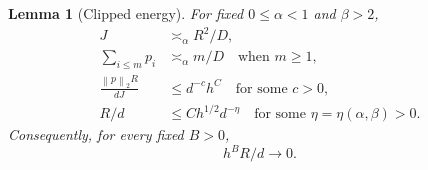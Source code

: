 \documentclass[11pt]{article}
\newtheorem{lemma}[theorem]{Lemma}
\theoremstyle{remark}
\newcommand{\norm}[1]{\left\lVert #1\right\rVert}
\newcommand{\1}{\mathbf 1}
\begin{document}
\begin{lemma}[Clipped energy]
\label{lem:arithmetic}
For fixed $0\leq\alpha<1$ and $\beta>2$,
\begin{align}
 J&\asymp_\alpha R^2/D,
 \label{eq:J-R}\\
 \sum_{i\leq m}p_i&\asymp_\alpha m/D
 \quad\text{when }m\geq1,
 \label{eq:head-mass}\\
 \frac{\norm{p}_2R}{dJ}&\leq d^{-c}h^C
 \quad\text{for some }c>0,
 \label{eq:cross-small}\\
 R/d&\leq Ch^{1/2}d^{-\eta}
 \quad\text{for some }\eta=\eta(\alpha,\beta)>0.
 \label{eq:R-small}
\end{align}
Consequently, for every fixed $B>0$,
\begin{equation}
 h^B R/d\longrightarrow0.
 \label{eq:R-polylog-small}
\end{equation}
\end{lemma}
\end{document}
